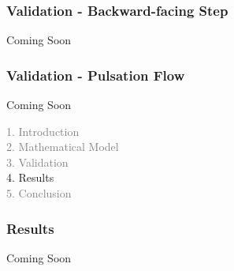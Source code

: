 
\begin{frame}
 \frametitle{\LARGE Validation - Backward-facing Step}
\begin{center}
 \Huge Coming Soon
\end{center}
\end{frame}



\begin{frame}
 \frametitle{\LARGE Validation - Pulsation Flow}
\begin{center}
 \Huge Coming Soon
\end{center}
\end{frame}




\begin{frame}
  \vspace{-1cm}
  \textcolor{gray}{1. Introduction}\\[0.1cm]
  \textcolor{gray}{2. Mathematical Model}\\[0.1cm]
  \textcolor{gray}{3. Validation}\\[0.1cm]
  4. Results\\[0.1cm]
  \textcolor{gray}{5. Conclusion}
\end{frame}



\begin{frame}
 \frametitle{\LARGE Results}
\begin{center}
 \Huge Coming Soon
\end{center}
\end{frame}



